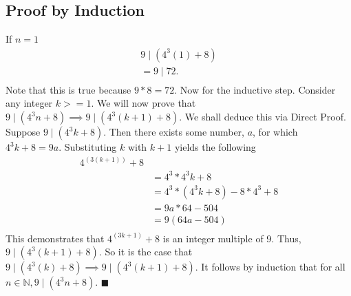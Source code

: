 \documentclass{article}
\newcommand*{\QEDA}{\hfill\ensuremath{\blacksquare}}%
\begin{document}
		\subsection{Proof by Induction} If $n = 1$
		\begin{align*}
		9 \mid (4^3(1) + 8)\\
		= 9 \mid 72.\\
		\end{align*}
		Note that this is true because $9*8=72$. Now for the inductive step. Consider any integer $k >= 1$. We will now prove that 
		$9 \mid (4^3n + 8) \implies 9 \mid (4^3(k+1) + 8)$. We shall deduce this via Direct Proof. Suppose $9 \mid (4^3k + 8)$. Then there exists some number, $a$, for which $4^3k + 8 = 9a$. Substituting $k$ with $k + 1$ yields the following
		\begin{align*}
		4^(3(k+1)) + 8\\
		&= 4^3 * 4^3k + 8\\
		&= 4^3 * (4^3k + 8) - 8*4^3 + 8\\
		&= 9a*64 - 504\\
		&= 9(64a - 504)\\
		\end{align*}
		This demonstrates that $4^(3k+1) + 8$ is an integer multiple of 9. Thus, $9 \mid (4^3(k+1) + 8)$. So it is the case that $9 \mid (4^3(k) + 8) \implies 9 \mid (4^3(k+1) + 8)$. It follows by induction that for all $n \in \mathbb{N}, 9 \mid (4^3n + 8)$. \QEDA	
\end{document}
